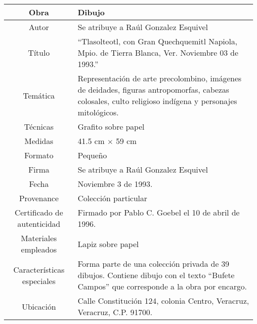 \begin{table}[H]
\centering
\begin{tabular}{|c|m{}|}
\hline
Obra& Dibujo	\\
\hline
Autor & Se atribuye a Ra\'ul Gonzalez Esquivel\\
\hline
T\'itulo & ``Tlasolteotl, con Gran Quechquemitl  Napiola, Mpio. de Tierra Blanca, Ver. Noviembre 03 de 1993.''\\
\hline
Tem\'atica & Representaci\'on de arte precolombino, im\'agenes de deidades, figuras antropomorfas, cabezas colosales, culto religioso ind\'igena y personajes mitol\'ogicos.\\
\hline
T\'ecnicas &Grafito sobre papel \\
\hline
Medidas & 41.5 cm $\times$ 59 cm \\
\hline
 Formato & Peque\~no \\
 \hline
 Firma & Se atribuye a Ra\'ul Gonzalez Esquivel\\ 
 \hline
  Fecha & Noviembre 3 de 1993.\\
 \hline
 Provenance & Colecci\'on particular\\
 \hline
 Certificado de autenticidad& Firmado por Pablo C. Goebel el 10 de abril de 1996.  \\
 \hline 
  Materiales empleados & Lapiz sobre papel\\
 \hline
 Caracter\'isticas especiales & Forma parte de una colecci\'on privada de 39 dibujos. 
Contiene dibujo con el texto ``Bufete Campos'' que corresponde a la obra por encargo. \\
\hline 
Ubicaci\'on & Calle Constituci\'on 124, colonia Centro, Veracruz, Veracruz, C.P. 91700.\\
\hline

\end{tabular}
\end{table}


